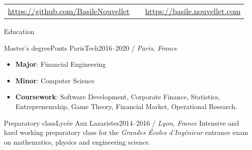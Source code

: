 \documentclass[]{mcdowellcv}
\begin{document}
    \makeheader

    \begin{tabu}
        to 1\textwidth { X[2,l,p] X[c,p] X[2,r,p] }
        {\small \url{https://github.com/BasileNouvellet}} & \textbf{} & {\small \url{https://basile.nouvellet.com}} \\
    \end{tabu}

    \begin{cvsection}{Education}

        \begin{cvsubsection}{Master's degree}{Ponts ParisTech}{2016--2020 / \textit{Paris, France}}
            \begin{itemize}
                \item \textbf{Major}: Financial Engineering
                \item \textbf{Minor}: Computer Science
                \item \textbf{Coursework}: Software Development, Corporate Finance, Statistics, Entrepreneurship, Game Theory, Financial Market, Operational Research.
            \end{itemize}
        \end{cvsubsection}

        \begin{cvsubsection}{Preparatory class}{Lyc\'ee Aux Lazaristes}{2014--2016 / \textit{Lyon, France}}
            Intensive and hard working preparatory class for the \textit{Grandes \'Ecoles d'Ing\'enieur} entrance exam on mathematics, physics and engineering science.
        \end{cvsubsection}

    \end{cvsection}
\end{document}
